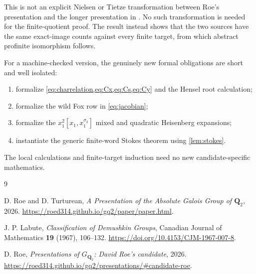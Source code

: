 \documentclass[11pt]{article}
\numberwithin{equation}{section}
\theoremstyle{definition}
\theoremstyle{remark}
\newcommand{\Q}{\mathbf Q}
\begin{document}
This is not an explicit Nielsen or Tietze transformation between Roe's
presentation and the longer presentation in \cite[Theorem~1.2]{RT}.
No such transformation is needed for the finite-quotient proof.  The result
instead shows that the two sources have the same exact-image counts against
every finite target, from which abstract profinite isomorphism follows.

For a machine-checked version, the genuinely new formal obligations are
short and well isolated:
\begin{enumerate}
  \item formalize \cref{eq:charrelation,eq:Cx,eq:Cs,eq:Cy} and
        the Hensel root calculation;
  \item formalize the wild Fox row in \cref{eq:jacobian};
  \item formalize the \(x_1^2[x_1,x_1^{\sigma_2}]\) mixed and quadratic
        Heisenberg expansions;
  \item instantiate the generic finite-word Stokes theorem using
        \cref{lem:stokes}.
\end{enumerate}
The local calculations and finite-target induction need no new
candidate-specific mathematics.

\begin{thebibliography}{9}

D. Roe and D. Turturean,
\emph{A Presentation of the Absolute Galois Group of \(\Q_2\)},
2026.
\newblock
\url{https://roed314.github.io/gq2/paper/paper.html}.

J. P. Labute,
\emph{Classification of Demushkin Groups},
Canadian Journal of Mathematics \textbf{19} (1967), 106--132.
\newblock
\url{https://doi.org/10.4153/CJM-1967-007-8}.

D. Roe,
\emph{Presentations of \(G_{\Q_2}\): David Roe's candidate},
2026.
\newblock
\url{https://roed314.github.io/gq2/presentations/#candidate-roe}.

\end{thebibliography}
\end{document}
